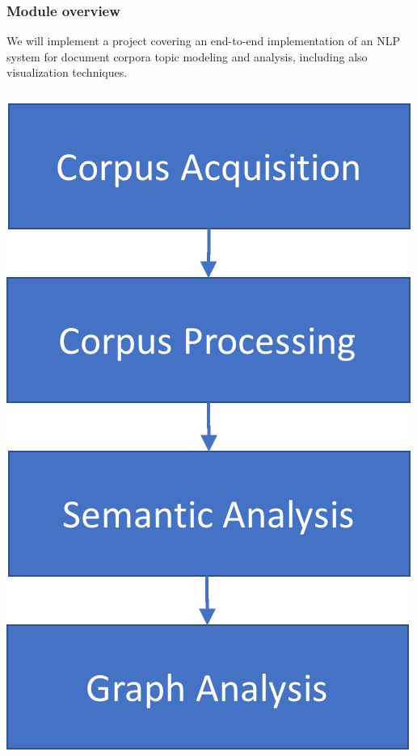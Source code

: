 \documentclass{beamer}
\begin{document}
\begin{frame}

	\frametitle{Module overview}

We will implement a project covering an end-to-end implementation of an NLP system for document corpora topic modeling and analysis, including also visualization techniques.

	\begin{columns}
	
	\begin{column}{.3\textwidth}
		\vspace{.2cm}
		\centerline{\includegraphics[width=.9\textwidth]{./figs/NLPTM_schema.png}}
	\end{column}
	

\end{columns}
\end{frame}
\end{document}

